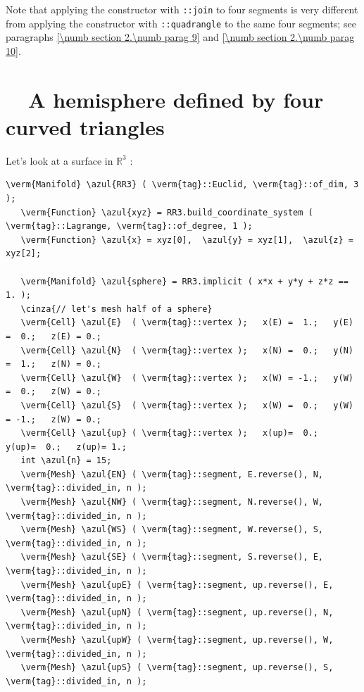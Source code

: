 Note that applying the {\small\tt {}} constructor with {\small\tt {}::join}
to four segments is very different from applying the {\small\tt {}} constructor with
{\small\tt {}::quadrangle} to the same four segments;
see paragraphs \ref{\numb section 2.\numb parag 9} and \ref{\numb section 2.\numb parag 10}.


\section{~~A hemisphere defined by four curved triangles}\label{\numb section 2.\numb parag 6}

Let's look at a surface in $ \mathbb{R}^3 $ :

\begin{Verbatim}[commandchars=\\\{\},formatcom=\small\tt,frame=single,
   label=parag-\ref{\numb section 2.\numb parag 6}.cpp,rulecolor=\color{coment},
   baselinestretch=0.94,framesep=2mm                                            ]
   \verm{Manifold} \azul{RR3} ( \verm{tag}::Euclid, \verm{tag}::of_dim, 3 );
   \verm{Function} \azul{xyz} = RR3.build_coordinate_system ( \verm{tag}::Lagrange, \verm{tag}::of_degree, 1 );
   \verm{Function} \azul{x} = xyz[0],  \azul{y} = xyz[1],  \azul{z} = xyz[2];

   \verm{Manifold} \azul{sphere} = RR3.implicit ( x*x + y*y + z*z == 1. );
   \cinza{// let's mesh half of a sphere}
   \verm{Cell} \azul{E}  ( \verm{tag}::vertex );   x(E) =  1.;   y(E) =  0.;   z(E) = 0.;
   \verm{Cell} \azul{N}  ( \verm{tag}::vertex );   x(N) =  0.;   y(N) =  1.;   z(N) = 0.;
   \verm{Cell} \azul{W}  ( \verm{tag}::vertex );   x(W) = -1.;   y(W) =  0.;   z(W) = 0.;
   \verm{Cell} \azul{S}  ( \verm{tag}::vertex );   x(W) =  0.;   y(W) = -1.;   z(W) = 0.;
   \verm{Cell} \azul{up} ( \verm{tag}::vertex );   x(up)=  0.;   y(up)=  0.;   z(up)= 1.;
   int \azul{n} = 15;
   \verm{Mesh} \azul{EN} ( \verm{tag}::segment, E.reverse(), N, \verm{tag}::divided_in, n );
   \verm{Mesh} \azul{NW} ( \verm{tag}::segment, N.reverse(), W, \verm{tag}::divided_in, n );
   \verm{Mesh} \azul{WS} ( \verm{tag}::segment, W.reverse(), S, \verm{tag}::divided_in, n );
   \verm{Mesh} \azul{SE} ( \verm{tag}::segment, S.reverse(), E, \verm{tag}::divided_in, n );
   \verm{Mesh} \azul{upE} ( \verm{tag}::segment, up.reverse(), E, \verm{tag}::divided_in, n );
   \verm{Mesh} \azul{upN} ( \verm{tag}::segment, up.reverse(), N, \verm{tag}::divided_in, n );
   \verm{Mesh} \azul{upW} ( \verm{tag}::segment, up.reverse(), W, \verm{tag}::divided_in, n );
   \verm{Mesh} \azul{upS} ( \verm{tag}::segment, up.reverse(), S, \verm{tag}::divided_in, n );
\end{Verbatim}

